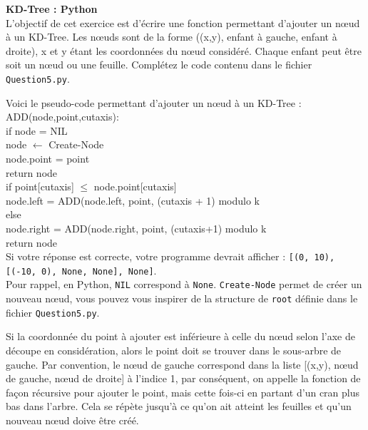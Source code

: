 \newpage

\begin{Exercice}[15 minutes]\textbf{KD-Tree : Python}\\

L'objectif de cet exercice est d'écrire une fonction permettant d'ajouter un nœud à un KD-Tree. Les nœuds sont de la forme ((x,y), enfant à gauche, enfant à droite), x et y étant les coordonnées du nœud considéré. Chaque enfant peut être soit un nœud ou une feuille. Complétez le code contenu dans le fichier \lstinline{Question5.py}.\\

\begin{conseil}


Voici le pseudo-code permettant d'ajouter un nœud à un KD-Tree :\\

ADD(node,point,cutaxis):\\
    \tabto{1cm}if node = NIL\\
        \tabto{2cm}node $\leftarrow$ Create-Node\\
        \tabto{2cm}node.point = point\\
        \tabto{2cm}return node\\
    \tabto{1cm}if point[cutaxis] $\leq$ node.point[cutaxis]\\
    \tabto{2cm} node.left = ADD(node.left, point, (cutaxis + 1) modulo k\\
    \tabto{1cm} else\\
    \tabto{2cm} node.right = ADD(node.right, point, (cutaxis+1) modulo k\\
    \tabto{1cm} return node\\
    
    Si votre réponse est correcte, votre programme devrait afficher : \lstinline{[(0, 10), [(-10, 0), None, None], None]}.\\
    Pour rappel, en Python, \lstinline{NIL} correspond à \lstinline{None}. \lstinline{Create-Node} permet de créer un nouveau nœud, vous pouvez vous inspirer de la structure de \lstinline{root} définie dans le fichier \lstinline{Question5.py}.
\end{conseil}

\begin{solution}


Si la coordonnée du point à ajouter est inférieure à celle du nœud selon l'axe de découpe en considération, alors le point doit se trouver dans le sous-arbre de gauche. Par convention, le nœud de gauche correspond dans la liste [(x,y), nœud de gauche, nœud de droite] à l'indice 1, par conséquent, on appelle la fonction de façon récursive pour ajouter le point, mais cette fois-ci en partant d'un cran plus bas dans l'arbre. Cela se répète jusqu'à ce qu'on ait atteint les feuilles et qu'un nouveau nœud doive être créé.

\end{solution}
\end{Exercice}

